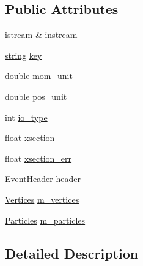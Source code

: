 \subsection*{Public Attributes}
\begin{DoxyCompactItemize}
\item 
istream \& \hyperlink{class_d_d4hep_1_1_simulation_1_1_hep_m_c_1_1_event_stream_a2702d64e41d9b280f84ebbae47521125}{instream}
\item 
\hyperlink{classstd_1_1string}{string} \hyperlink{class_d_d4hep_1_1_simulation_1_1_hep_m_c_1_1_event_stream_ac17d00d243288f0b1dec90a167b57868}{key}
\item 
double \hyperlink{class_d_d4hep_1_1_simulation_1_1_hep_m_c_1_1_event_stream_a3f8d6aeef7a8fa342bc15e7b17eb7d40}{mom\_\-unit}
\item 
double \hyperlink{class_d_d4hep_1_1_simulation_1_1_hep_m_c_1_1_event_stream_ab528124a867412138e1d22b2310c1bad}{pos\_\-unit}
\item 
int \hyperlink{class_d_d4hep_1_1_simulation_1_1_hep_m_c_1_1_event_stream_ab72b33619d738dd59539035f4e02792f}{io\_\-type}
\item 
float \hyperlink{class_d_d4hep_1_1_simulation_1_1_hep_m_c_1_1_event_stream_a3f6b9fa99fe2752282e3650c51ad4918}{xsection}
\item 
float \hyperlink{class_d_d4hep_1_1_simulation_1_1_hep_m_c_1_1_event_stream_ab2ad757474584ec785c50c36181b2ae2}{xsection\_\-err}
\item 
\hyperlink{class_d_d4hep_1_1_simulation_1_1_hep_m_c_1_1_event_header}{EventHeader} \hyperlink{class_d_d4hep_1_1_simulation_1_1_hep_m_c_1_1_event_stream_ac60c5b73780a0d523e2042a93610dfe3}{header}
\item 
\hyperlink{class_d_d4hep_1_1_simulation_1_1_hep_m_c_1_1_event_stream_a3e270d38edde8369e52ad396615a2755}{Vertices} \hyperlink{class_d_d4hep_1_1_simulation_1_1_hep_m_c_1_1_event_stream_a714f7fea3a85b72aa7c925c580a2fe36}{m\_\-vertices}
\item 
\hyperlink{class_d_d4hep_1_1_simulation_1_1_hep_m_c_1_1_event_stream_a99e0260f816229d8ab3ebdd5487b3af1}{Particles} \hyperlink{class_d_d4hep_1_1_simulation_1_1_hep_m_c_1_1_event_stream_a40291edf72d71405515c98ea77e6670c}{m\_\-particles}
\end{DoxyCompactItemize}


\subsection{Detailed Description}


